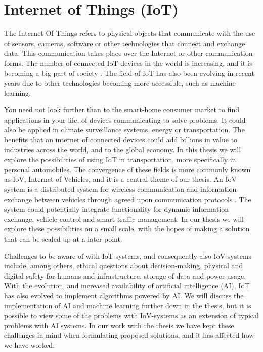 \section{Internet of Things (IoT)}
The Internet Of Things refers to physical objects that communicate with the use of sensors, cameras, software or other technologies that connect and exchange data. This communication takes place over the Internet or other communication forms. The number of connected IoT-devices in the world is increasing, and it is becoming a big part of society \parencite{iot_analytics}. The field of IoT has also been evolving in recent years due to other technologies becoming more accessible, such as machine learning.

You need not look further than to the smart-home consumer market to find applications in your life, of devices communicating to solve problems. It could also be applied in climate surveillance systems, energy or transportation. The benefits that an internet of connected devices could add billions in value to industries across the world, and to the global economy. In this thesis we will explore the possibilities of using IoT in transportation, more specifically in personal automobiles. The convergence of these fields is more commonly known as IoV, Internet of Vehicles, and it is a central theme of our thesis. An IoV system is a distributed system for wireless communication and information exchange between vehicles through agreed upon communication protocols \parencite{chinese_iov}.  The system could potentially integrate functionality for dynamic information exchange, vehicle control and  smart traffic management. In our thesis we will explore these possibilities on a small scale, with the hopes of making a solution that can be scaled up at a later point. 

Challenges to be aware of with IoT-systems, and consequently also IoV-systems include, among others, ethical questions about decision-making, physical and digital safety for humans and infrastructure, storage of data and power usage. With the evolution, and increased availability of artificial intelligence (AI), IoT has also evolved to implement algorithms powered by AI. We will discuss the implementation of AI and machine learning further down in the thesis, but it is possible to view some of the problems with IoV-systems as an extension of typical problems with AI systems. In our work with the thesis we have kept these challenges in mind when formulating proposed solutions, and it has affected how we have worked.

